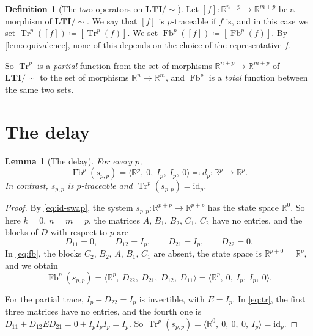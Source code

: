 \documentclass[11pt,a4paper]{article}
\theoremstyle{plain}
\newtheorem{lemma}[theorem]{Lemma}
\theoremstyle{definition}
\newtheorem{definition}[theorem]{Definition}
\theoremstyle{remark}
\DeclareMathOperator{\Fb}{Fb}
\DeclareMathOperator{\Tr}{Tr}
\newcommand{\R}{\mathbb{R}}
\newcommand{\id}{\mathrm{id}}
\newcommand{\LTIq}{\mathbf{LTI}/{\sim}}
\newcommand{\sys}[5]{\bigl\langle #1,\ #2,\ #3,\ #4,\ #5 \bigr\rangle}
\begin{document}
\begin{definition}[The two operators on $\LTIq$]
    \label{def:quotient}
    Let $[f] \colon \R^{n+p} \to \R^{m+p}$ be a morphism of $\LTIq$.
    We say that $[f]$ is $p$-traceable if $f$ is, and in this case we set $\Tr^p([f]) \coloneqq [\Tr^p(f)]$.
    We set $\Fb^p([f]) \coloneqq [\Fb^p(f)]$.
    By \cref{lem:equivalence}, none of this depends on the choice of the representative $f$.
\end{definition}

So $\Tr^p$ is a \emph{partial} function from the set of morphisms $\R^{n+p} \to \R^{m+p}$ of $\LTIq$ to the set of morphisms $\R^n \to \R^m$, and $\Fb^p$ is a \emph{total} function between the same two sets.

\section{The delay}

\begin{lemma}[The delay]
    \label{lem:delay}
    For every $p$,
    \begin{equation}
        \label{eq:delay}
        \Fb^p(s_{p,p}) = \sys{\R^p}{0}{I_p}{I_p}{0} \eqqcolon d_p \colon \R^p \to \R^p .
    \end{equation}
    In contrast, $s_{p,p}$ is $p$-traceable and $\Tr^p(s_{p,p}) = \id_p$.
\end{lemma}

\begin{proof}
    By \cref{eq:id-swap}, the system $s_{p,p} \colon \R^{p+p} \to \R^{p+p}$ has the state space $\R^0$.
    So here $k = 0$, $n = m = p$, the matrices $A$, $B_1$, $B_2$, $C_1$, $C_2$ have no entries, and the blocks of $D$ with respect to $p$ are
    \begin{equation*}
        D_{11} = 0, \qquad D_{12} = I_p, \qquad D_{21} = I_p, \qquad D_{22} = 0 .
    \end{equation*}
    In \cref{eq:fb}, the blocks $C_2$, $B_2$, $A$, $B_1$, $C_1$ are absent, the state space is $\R^{p+0} = \R^p$, and we obtain
    \begin{equation*}
        \Fb^p(s_{p,p}) = \sys{\R^{p}}{D_{22}}{D_{21}}{D_{12}}{D_{11}} = \sys{\R^p}{0}{I_p}{I_p}{0} .
    \end{equation*}

    For the partial trace, $I_p - D_{22} = I_p$ is invertible, with $E = I_p$.
    In \cref{eq:tr}, the first three matrices have no entries, and the fourth one is $D_{11} + D_{12} E D_{21} = 0 + I_p I_p I_p = I_p$.
    So $\Tr^p(s_{p,p}) = \sys{\R^0}{0}{0}{0}{I_p} = \id_p$.
\end{proof}
\end{document}
